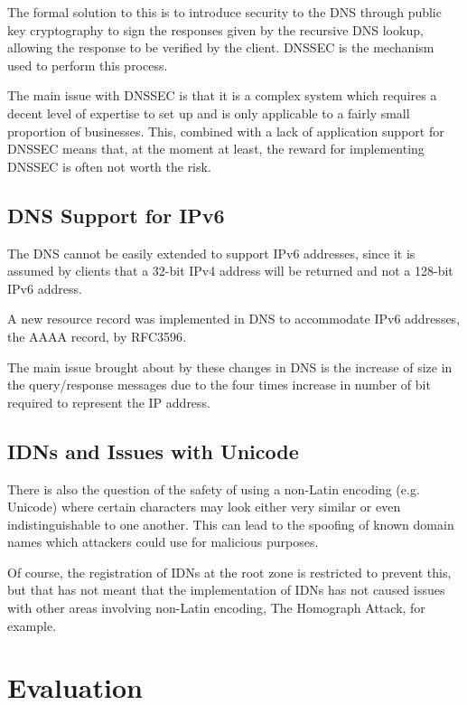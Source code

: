 \documentclass[11pt, a4paper]{article}
\begin{document}
The formal solution to this is to introduce security to the \gls{DNS} through
public key cryptography to sign the responses given by the recursive \gls{DNS}
lookup, allowing the response to be verified by the client. \Gls{DNSSEC} is the
mechanism used to perform this process.

The main issue with \gls{DNSSEC} is that it is a complex system which requires
a decent level of expertise to set up and is only applicable to a fairly small
proportion of businesses. This, combined with a lack of application support for
\gls{DNSSEC} means that, at the moment at least, the reward for implementing
\gls{DNSSEC} is often not worth the risk\cite{rasmussen2011risk}.

\subsection{DNS Support for IPv6}
\label{subsec:dnsipv6}

The \gls{DNS} cannot be easily extended to support IPv6 addresses, since it is
assumed by clients that a 32-bit IPv4 address will be returned and not a 128-bit
IPv6 address.

A new resource record was implemented in \gls{DNS} to accommodate IPv6 
addresses, the AAAA record, by RFC3596\cite{rfc3596}.

The main issue brought about by these changes in \gls{DNS} is the increase of
size in the query/response messages due to the four times increase in number of
bit required to represent the IP address.

\subsection{IDNs and Issues with Unicode}
There is also the question of the safety of using a non-Latin encoding
(e.g. Unicode) where certain characters may look either very similar or even
indistinguishable to one another\cite{kaufman2013unicode}. This can lead to the
spoofing of known domain names which attackers could use for malicious purposes.

Of course, the registration of \glspl{IDN} at the root zone is restricted to
prevent this\cite{icann2011idns}, but that has not meant that the implementation of \glspl{IDN} has
not caused issues with other areas involving non-Latin encoding, The Homograph 
Attack\cite{gabrilovich2002homograph}, for example.


\newpage
\section{Evaluation}
\end{document}

